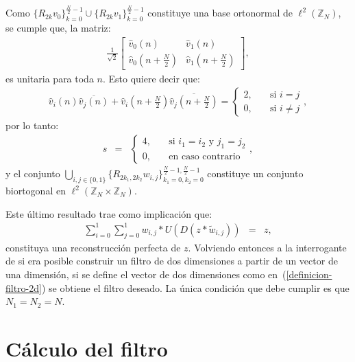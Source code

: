 \par Como $\{R_{2k}v_0\}_{k=0}^{\frac{N}{2}-1}\cup\{R_{2k}v_1\}_{k=0}^{\frac{N}{2}-1}$ constituye una base ortonormal de $\ell^2(\mathbb{Z}_N)$, se cumple que, la matriz:
\begin{eqnarray}
\frac{1}{\sqrt{2}}\left[\begin{array}{cc}
\hat{v}_0(n)&\hat{v}_1(n)\\
\hat{v}_0\left(n+\frac{N}{2}\right)&\hat{v}_1\left(n+\frac{N}{2}\right)
\end{array}\right],\nonumber
\end{eqnarray}
es unitaria para toda $n$. Esto quiere decir que:
\begin{eqnarray}
\hat{v}_i(n)\overline{\hat{v}_j(n)}+\hat{v}_i\left(n+\frac{N}{2}\right)\overline{\hat{v}_j\left(n+\frac{N}{2}\right)}=\left\{\begin{array}{ll}
2,&\quad\mbox{si $i=j$}\\
0,&\quad\mbox{si $i\neq j$}
\end{array}\right.,\nonumber
\end{eqnarray}
por lo tanto:
\begin{eqnarray}
s&=&\left\{\begin{array}{ll}
4,&\quad\mbox{si $i_1=i_2$ y $j_1=j_2$}\\
0,&\quad\mbox{en caso contrario}
\end{array}\right.,\nonumber
\end{eqnarray}
y el conjunto $\displaystyle\bigcup_{i,j\in\{0,1\}}\{R_{2k_1,2k_2}w_{i,j}\}_{k_1=0,k_2=0}^{\frac{N}{2}-1,\frac{N}{2}-1}$ constituye un conjunto biortogonal en $\ell^2(\mathbb{Z}_N\times\mathbb{Z}_N)$.

\par Este \'ultimo resultado trae como implicaci\'on que:
\begin{eqnarray}
\sum_{i=0}^1\sum_{j=0}^1w_{i,j}\ast U(D(z\ast\tilde{w}_{i,j}))&=&z,\nonumber
\end{eqnarray}
constituya una reconstrucci\'on perfecta de $z$. Volviendo entonces a la interrogante de si era posible construir un filtro de dos dimensiones a partir de un vector de una dimensi\'on, si se define el vector de dos dimensiones como en~(\ref{definicion-filtro-2d}) se obtiene el filtro deseado. La \'unica condici\'on que debe cumplir es que $N_1=N_2=N$.

\section{C\'alculo del filtro}


